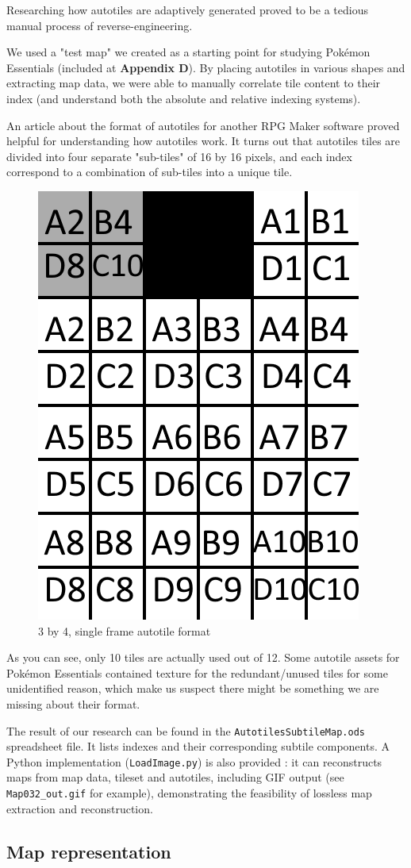 \documentclass[11pt]{article}
\begin{document}
{Researching how autotiles are adaptively generated proved to be a tedious manual process of reverse-engineering. 

We used a "test map" we created as a starting point for studying Pokémon Essentials (included at \textbf{Appendix D}). By placing autotiles in various shapes and extracting map data, we were able to manually correlate tile content to their index (and understand both the absolute and relative indexing systems).

An article about the format of autotiles for another RPG Maker software \cite{Autotile} proved helpful for understanding how autotiles work. It turns out that autotiles tiles are divided into four separate "sub-tiles" of 16 by 16 pixels, and each index correspond to a combination of sub-tiles into a unique tile.

\vspace{4mm}
\begin{figure}[!h]
	\centering
	\includegraphics[width=.3\linewidth]{Autotiles_16x16}
	\caption{3 by 4, single frame autotile format}
\end{figure}
\vspace{4mm}

As you can see, only 10 tiles are actually used out of 12. Some autotile assets for Pokémon Essentials contained texture for the redundant/unused tiles for some unidentified reason, which make us suspect there might be something we are missing about their format.

The result of our research can be found in the \verb|AutotilesSubtileMap.ods| spreadsheet file. It lists indexes and their corresponding subtile components. A Python implementation (\verb|LoadImage.py|) is also provided : it can reconstructs maps from map data, tileset and autotiles, including GIF output (see \verb|Map032_out.gif| for example), demonstrating the feasibility of lossless map extraction and reconstruction.




\subsection{Map representation}

}
\end{document}
